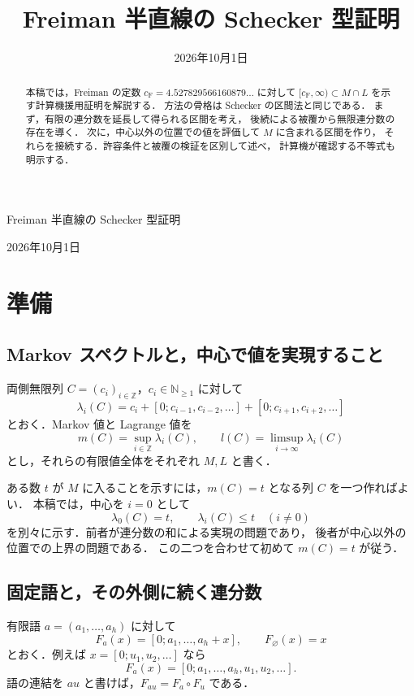 \documentclass[11pt,a4paper]{article}
\title{Freiman 半直線の Schecker 型証明}
\author{}
\date{2026年10月1日}
\theoremstyle{definition}
\newcommand{\CF}{c_{\mathrm F}}
\newcommand{\eps}{\varnothing}
\begin{document}
\begin{center}
{\LARGE Freiman 半直線の Schecker 型証明\par}
\vspace{10pt}
2026年10月1日
\end{center}
\vspace{8pt}
\begin{abstract}
本稿では，Freiman の定数 $\CF=4.527829566160879\ldots$ に対して
$[\CF,\infty)\subset M\cap L$ を示す計算機援用証明を解説する．
方法の骨格は Schecker の区間法と同じである．
まず，有限の連分数を延長して得られる区間を考え，
後続による被覆から無限連分数の存在を導く．
次に，中心以外の位置での値を評価して $M$ に含まれる区間を作り，
それらを接続する．許容条件と被覆の検証を区別して述べ，
計算機が確認する不等式も明示する．
\end{abstract}

\section{準備}\label{sec:preparation}

\subsection{Markov スペクトルと，中心で値を実現すること}
両側無限列 $C=(c_i)_{i\in\mathbb Z}$，$c_i\in\mathbb N_{\ge1}$ に対して
\[
 \lambda_i(C)=c_i+[0;c_{i-1},c_{i-2},\ldots]+[0;c_{i+1},c_{i+2},\ldots]
\]
とおく．Markov 値と Lagrange 値を
\[
 m(C)=\sup_{i\in\mathbb Z}\lambda_i(C),\qquad
 l(C)=\limsup_{i\to\infty}\lambda_i(C)
\]
とし，それらの有限値全体をそれぞれ $M,L$ と書く．

ある数 $t$ が $M$ に入ることを示すには，$m(C)=t$ となる列 $C$ を一つ作ればよい．
本稿では，中心を $i=0$ として
\begin{equation}\label{eq:two-tasks}
 \lambda_0(C)=t,\qquad \lambda_i(C)\le t\quad(i\ne0)
\end{equation}
を別々に示す．前者が連分数の和による実現の問題であり，
後者が中心以外の位置での上界の問題である．
この二つを合わせて初めて $m(C)=t$ が従う．

\subsection{固定語と，その外側に続く連分数}
有限語 $a=(a_1,\ldots,a_h)$ に対して
\[
 F_a(x)=[0;a_1,\ldots,a_h+x],\qquad F_\eps(x)=x
\]
とおく．例えば $x=[0;u_1,u_2,\ldots]$ なら
\[
 F_a(x)=[0;a_1,\ldots,a_h,u_1,u_2,\ldots].
\]
語の連結を $au$ と書けば，$F_{au}=F_a\circ F_u$ である．
\end{document}

